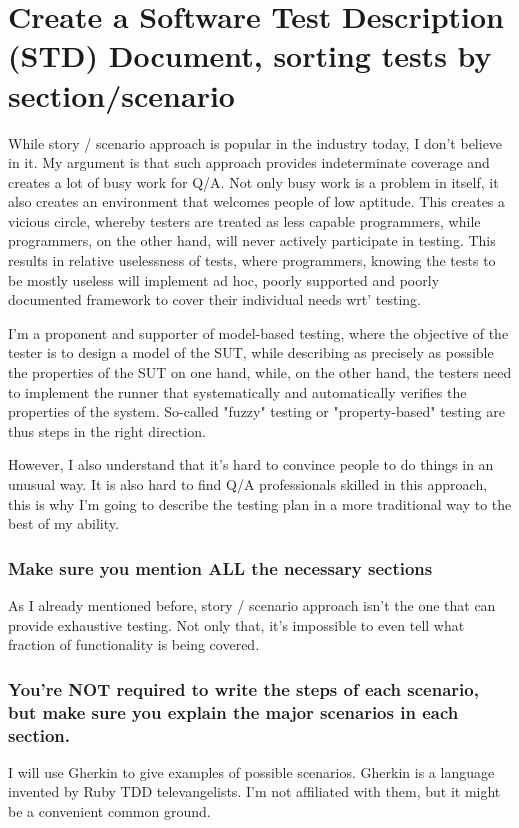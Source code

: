 \documentclass[11pt]{article}
\begin{document}
\section{Create a Software Test Description (STD) Document, sorting tests by section/scenario}
\label{sec:org0314c1e}
While story / scenario approach is popular in the industry today, I
don't believe in it.  My argument is that such approach provides
indeterminate coverage and creates a lot of busy work for Q/A.  Not
only busy work is a problem in itself, it also creates an
environment that welcomes people of low aptitude.  This creates a
vicious circle, whereby testers are treated as less capable
programmers, while programmers, on the other hand, will never
actively participate in testing.  This results in relative
uselessness of tests, where programmers, knowing the tests to be
mostly useless will implement ad hoc, poorly supported and poorly
documented framework to cover their individual needs wrt' testing.

I'm a proponent and supporter of model-based testing, where the
objective of the tester is to design a model of the SUT, while
describing as precisely as possible the properties of the SUT on one
hand, while, on the other hand, the testers need to implement the
runner that systematically and automatically verifies the properties
of the system.  So-called "fuzzy" testing or "property-based"
testing are thus steps in the right direction.

However, I also understand that it's hard to convince people to do
things in an unusual way.  It is also hard to find Q/A professionals
skilled in this approach, this is why I'm going to describe the
testing plan in a more traditional way to the best of my ability.

\subsubsection{Make sure you mention ALL the necessary sections}
\label{sec:org89e698d}
As I already mentioned before, story / scenario approach isn't the
one that can provide exhaustive testing.  Not only that, it's
impossible to even tell what fraction of functionality is being
covered.

\subsubsection{You're NOT required to write the steps of each scenario, but make sure you explain the major scenarios in each section.}
\label{sec:orgebad890}
I will use Gherkin to give examples of possible scenarios.
Gherkin is a language invented by Ruby TDD televangelists.  I'm
not affiliated with them, but it might be a convenient common
ground.
\end{document}
